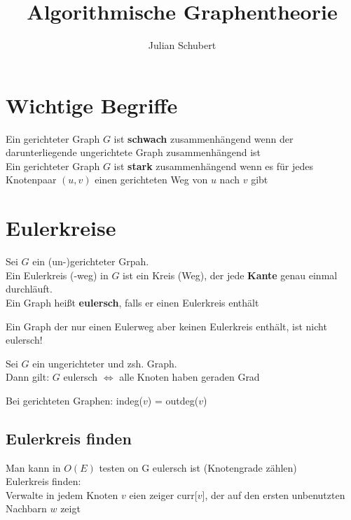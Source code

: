 \documentclass[14pt]{article}
\title{Algorithmische Graphentheorie}
\author{Julian Schubert}
\begin{document}
    \maketitle
    \tableofcontents

    \newpage
    \section{Wichtige Begriffe}
    \begin{definition}
        Ein gerichteter Graph $G$ ist \textbf{schwach} zusammenhängend
        wenn der darunterliegende ungerichtete Graph zusammenhängend 
        ist \\
        Ein gerichteter Graph $G$ ist \textbf{stark} zusammenhängend
        wenn es für jedes Knotenpaar $(u, v)$ einen gerichteten Weg 
        von $u$ nach $v$ gibt
    \end{definition}

    \section{Eulerkreise}
    \begin{definition}[Eulerkreis]
        Sei $G$ ein (un-)gerichteter Grpah. \\
        Ein Eulerkreis (-weg) in 
        $G$ ist ein Kreis (Weg), der jede \textbf{Kante} genau 
        einmal durchläuft. \\
        Ein Graph heißt \textbf{eulersch}, falls er einen 
        Eulerkreis enthält
    \end{definition}
    Ein Graph der nur einen Eulerweg aber keinen Eulerkreis 
    enthält, ist nicht eulersch!
    \begin{eigenschaft}
        Sei $G$ ein ungerichteter und zsh. Graph.  \\
        Dann gilt:
        $G$ eulersch $\Leftrightarrow$ alle Knoten haben geraden Grad
    \end{eigenschaft}
    Bei gerichteten Graphen: indeg($v$) = outdeg($v$)
    \subsection{Eulerkreis finden}
        Man kann in $O(E)$ testen on G eulersch ist (Knotengrade zählen) \\
        Eulerkreis finden: \\
        Verwalte in jedem Knoten $v$ eien zeiger curr[$v$], der auf 
        den ersten unbenutzten Nachbarn $w$ zeigt
    
\end{document}
